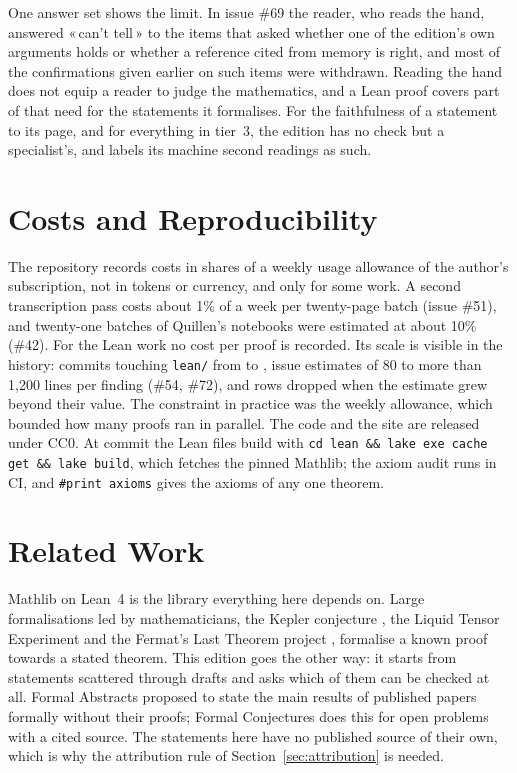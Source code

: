 \documentclass[runningheads,a4paper]{llncs}
\newcommand{\q}[1]{«\,#1\,»}
\newcommand{\lean}[1]{\texttt{#1}}
\begin{document}
One answer set shows the limit. In issue \#69 the reader, who reads the hand, answered \q{can't tell} to the items that asked whether one of the edition's own arguments holds or whether a reference cited from memory is right, and most of the confirmations given earlier on such items were withdrawn. Reading the hand does not equip a reader to judge the mathematics, and a Lean proof covers part of that need for the statements it formalises. For the faithfulness of a statement to its page, and for everything in tier~3, the edition has no check but a specialist's, and labels its machine second readings as such.

\section{Costs and Reproducibility}\label{sec:costs}

The repository records costs in shares of a weekly usage allowance of the author's subscription, not in tokens or currency, and only for some work. A second transcription pass costs about 1\% of a week per twenty-page batch (issue \#51), and twenty-one batches of Quillen's notebooks were estimated at about 10\% (\#42). For the Lean work no cost per proof is recorded. Its scale is visible in the history: \cntCommits{} commits touching \texttt{lean/} from \cntFirstCommit{} to \cntSnapshotDate, issue estimates of 80 to more than 1,200 lines per finding (\#54, \#72), and rows dropped when the estimate grew beyond their value. The constraint in practice was the weekly allowance, which bounded how many proofs ran in parallel. The code and the site are released under CC0. At commit \cntSnapshot{} the Lean files build with \texttt{cd lean \&\& lake exe cache get \&\& lake build}, which fetches the pinned Mathlib; the axiom audit runs in CI, and \lean{\#print axioms} gives the axioms of any one theorem.

\section{Related Work}\label{sec:related}

Mathlib \cite{mathlib2020} on Lean~4 \cite{lean4} is the library everything here depends on. Large formalisations led by mathematicians, the Kepler conjecture \cite{hales2017}, the Liquid Tensor Experiment \cite{scholze2022,castelvecchi2021} and the Fermat's Last Theorem project \cite{fltproject,best2023}, formalise a known proof towards a stated theorem. This edition goes the other way: it starts from statements scattered through drafts and asks which of them can be checked at all. Formal Abstracts \cite{formalabstracts} proposed to state the main results of published papers formally without their proofs; Formal Conjectures \cite{formalconjectures} does this for open problems with a cited source. The statements here have no published source of their own, which is why the attribution rule of Section~\ref{sec:attribution} is needed.
\end{document}
